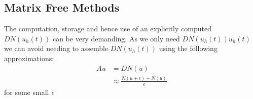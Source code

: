 \subsection{Matrix Free Methods}
The computation, storage and hence use of an explicitly computed $DN(u_h(t))$ can be very demanding.
As we only need $DN(u_h(t))u_h(t)$ we can avoid needing to assemble $DN(u_h(t))$ using the following approximations:
\begin{align*}
    Au &= DN(u)\\
    &\approx \frac{N(u+\epsilon)-N(u)}{\epsilon}
\end{align*}
for some small $\epsilon$